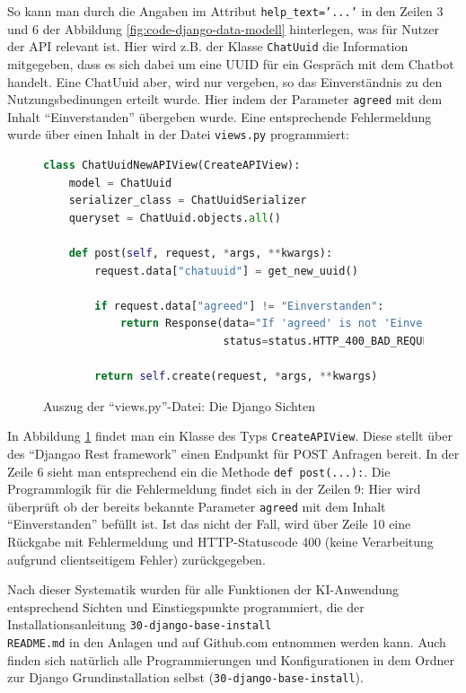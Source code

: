 \documentclass[12pt,oneside,titlepage,listof=totoc,bibliography=totoc]{scrartcl}
\newcommand{\code}[1]{\colorbox{code-gray}{\texttt{#1}}}
\begin{document}
So kann man durch die Angaben im Attribut \code{help_text='...'} in den Zeilen 3 und 6 der Abbildung \ref{fig:code-django-data-modell} hinterlegen, was für Nutzer der API relevant ist. Hier wird z.B. der Klasse \code{ChatUuid} die Information mitgegeben, dass es sich dabei um eine \ac{UUID} für ein Gespräch mit dem Chatbot handelt. Eine ChatUuid aber, wird nur vergeben, so das Einverständnis zu den Nutzungsbedinungen erteilt wurde. Hier indem der Parameter \code{agreed} mit dem Inhalt \enquote{Einverstanden} übergeben wurde. Eine entsprechende Fehlermeldung wurde über einen Inhalt in der Datei \code{views.py} programmiert: 

\begin{figure}[H]
	\caption{Auszug der \enquote{views.py}-Datei: Die Django Sichten}
	\label{fig:code-django-views}
\begin{lstlisting}[language=python]
class ChatUuidNewAPIView(CreateAPIView):
    model = ChatUuid
    serializer_class = ChatUuidSerializer
    queryset = ChatUuid.objects.all()

    def post(self, request, *args, **kwargs):
        request.data["chatuuid"] = get_new_uuid()

        if request.data["agreed"] != "Einverstanden":
            return Response(data="If 'agreed' is not 'Einverstanden' you can not use the services.",
                            status=status.HTTP_400_BAD_REQUEST)

        return self.create(request, *args, **kwargs)
\end{lstlisting}
\end{figure}

In Abbildung \ref{fig:code-django-views} findet man ein Klasse des Typs \code{CreateAPIView}. Diese stellt über des \enquote{Djangao Rest framework} einen Endpunkt für POST Anfragen bereit. In der Zeile 6 sieht man entsprechend ein die Methode \code{def post(...):}. Die Programmlogik für die Fehlermeldung findet sich in der Zeilen 9: Hier wird überprüft ob der bereits bekannte Parameter \code{agreed} mit dem Inhalt \enquote{Einverstanden} befüllt ist. Ist das nicht der Fall, wird über Zeile 10 eine Rückgabe mit Fehlermeldung und HTTP-Statuscode 400 (keine Verarbeitung aufgrund clientseitigem Fehler) zurückgegeben.

Nach dieser Systematik wurden für alle Funktionen der KI-Anwendung entsprechend Sichten und Einstiegspunkte programmiert, die der Installationsanleitung \code{30-django-base-install\\README.md} in den Anlagen und auf Github.com entnommen werden kann. Auch finden sich natürlich alle Programmierungen und Konfigurationen in dem Ordner zur Django Grundinstallation selbst (\code{30-django-base-install}). 
\end{document}
